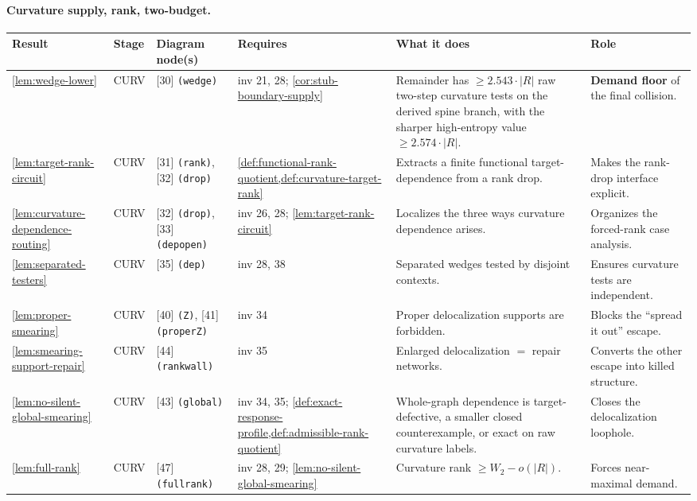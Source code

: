 \documentclass[11pt]{article}
\begin{document}
\paragraph{Curvature supply, rank, two-budget.}
{\scriptsize\setlength{\tabcolsep}{3pt}
\begin{longtable}{L{0.10\textwidth} C{0.045\textwidth} L{0.13\textwidth} L{0.135\textwidth} L{0.28\textwidth} L{0.20\textwidth}}
\toprule
\textbf{Result} & \textbf{Stage} & \textbf{Diagram node(s)} & \textbf{Requires} & \textbf{What it does} & \textbf{Role} \\
\midrule
\endhead
\cref{lem:wedge-lower} & CURV & [30] \texttt{(wedge)} & inv 21, 28; \cref{cor:stub-boundary-supply} & Remainder has $\ge2.543\cdot|R|$ raw two-step curvature tests on the derived spine branch, with the sharper high-entropy value $\ge2.574\cdot|R|$. & \textbf{Demand floor} of the final collision. \\
\cref{lem:target-rank-circuit} & CURV & [31] \texttt{(rank)}, [32] \texttt{(drop)} & \cref{def:functional-rank-quotient,def:curvature-target-rank} & Extracts a finite functional target-dependence from a rank drop. & Makes the rank-drop interface explicit. \\
\cref{lem:curvature-dependence-routing} & CURV & [32] \texttt{(drop)}, [33] \texttt{(depopen)} & inv 26, 28; \cref{lem:target-rank-circuit} & Localizes the three ways curvature dependence arises. & Organizes the forced-rank case analysis. \\
\cref{lem:separated-testers} & CURV & [35] \texttt{(dep)} & inv 28, 38 & Separated wedges tested by disjoint contexts. & Ensures curvature tests are independent. \\
\cref{lem:proper-smearing} & CURV & [40] \texttt{(Z)}, [41] \texttt{(properZ)} & inv 34 & Proper delocalization supports are forbidden. & Blocks the ``spread it out'' escape. \\
\cref{lem:smearing-support-repair} & CURV & [44] \texttt{(rankwall)} & inv 35 & Enlarged delocalization $=$ repair networks. & Converts the other escape into killed structure. \\
\cref{lem:no-silent-global-smearing} & CURV & [43] \texttt{(global)} & inv 34, 35; \cref{def:exact-response-profile,def:admissible-rank-quotient} & Whole-graph dependence is target-defective, a smaller closed counterexample, or exact on raw curvature labels. & Closes the delocalization loophole. \\
\cref{lem:full-rank} & CURV & [47] \texttt{(fullrank)} & inv 28, 29; \cref{lem:no-silent-global-smearing} & Curvature rank $\ge W_2-o(|R|)$. & Forces near-maximal demand. \\

\end{longtable}}
\end{document}
